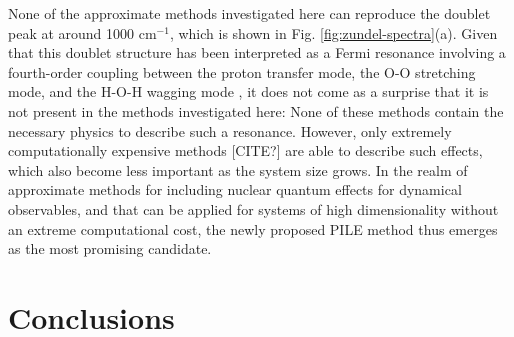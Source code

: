 \documentclass[aps,prb,superscriptaddress,amsmath,amssymb,showpacs,twocolumn]{revtex4}
\begin{document}
None of the approximate methods investigated here can reproduce the
doublet peak at around 1000 cm$^{-1}$, which is shown in Fig. \ref{fig:zundel-spectra}(a).
Given that this doublet structure has been interpreted as a Fermi resonance
involving a fourth-order coupling between the proton transfer mode,
the O-O stretching mode, and the H-O-H wagging mode \cite{VendrellMeyer2007, Schatteburg2008},
it does not come as a surprise that it is not present in the methods investigated here:
None of these methods contain the necessary physics to describe such a resonance.
However, only extremely computationally expensive methods [CITE?] are able to describe
such effects, which also become less important as the system size grows. In the realm
of approximate methods for including nuclear quantum effects for dynamical observables,
and that can be applied for systems of high dimensionality without an extreme
computational cost, the newly proposed PILE method
thus emerges as the most promising candidate. 



\section{Conclusions}









\end{document}
